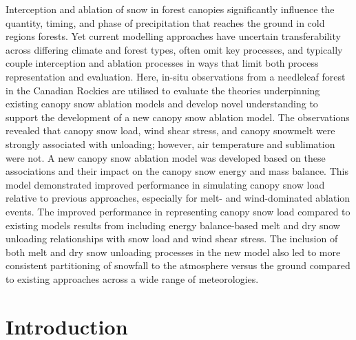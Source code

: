 \documentclass[
  letterpaper,
]{tex/uofsthesis-cs}
\begin{document}
Interception and ablation of snow in forest canopies significantly
influence the quantity, timing, and phase of precipitation that reaches
the ground in cold regions forests. Yet current modelling approaches
have uncertain transferability across differing climate and forest
types, often omit key processes, and typically couple interception and
ablation processes in ways that limit both process representation and
evaluation. Here, in-situ observations from a needleleaf forest in the
Canadian Rockies are utilised to evaluate the theories underpinning
existing canopy snow ablation models and develop novel understanding to
support the development of a new canopy snow ablation model. The
observations revealed that canopy snow load, wind shear stress, and
canopy snowmelt were strongly associated with unloading; however, air
temperature and sublimation were not. A new canopy snow ablation model
was developed based on these associations and their impact on the canopy
snow energy and mass balance. This model demonstrated improved
performance in simulating canopy snow load relative to previous
approaches, especially for melt- and wind-dominated ablation events. The
improved performance in representing canopy snow load compared to
existing models results from including energy balance-based melt and dry
snow unloading relationships with snow load and wind shear stress. The
inclusion of both melt and dry snow unloading processes in the new model
also led to more consistent partitioning of snowfall to the atmosphere
versus the ground compared to existing approaches across a wide range of
meteorologies.

\section{Introduction}\label{introduction-3}
\end{document}
